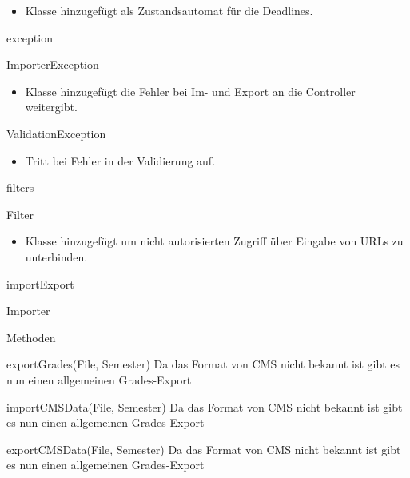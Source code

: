\documentclass[parskip=full]{scrartcl}
\newcommand{\changeDescription}[1]{{\newline\color{black}\normalfont #1}}
\newcommand{\code}[1]{{\ttfamily #1}}
\begin{document}
\begin{itemPackage}
\begin{itemClass}
	\begin{itemize}
	  \item Klasse hinzugefügt als Zustandsautomat für die Deadlines. 
	\end{itemize}
	\end{itemClass}
\item exception
\begin{itemClass}
\item ImporterException 
\begin{itemize}
	  \item Klasse hinzugefügt die Fehler bei Im- und Export an die Controller
	  weitergibt.
	\end{itemize}
	\item ValidationException
\begin{itemize}
  \item Tritt bei Fehler in der Validierung auf.
\end{itemize}
\end{itemClass}
\item filters
\begin{itemClass}
\item Filter
\begin{itemize}
	  \item Klasse hinzugefügt um nicht autorisierten Zugriff über Eingabe von URLs
	  zu unterbinden.
	\end{itemize}
\end{itemClass}
\item importExport
\begin{itemClass}
\item Importer
\begin{itemClassSub}
\item Methoden
\begin{itemPlus}
\item exportGrades(File, Semester) \changeDescription{Da das Format von CMS
nicht bekannt ist gibt es nun einen allgemeinen \code{Grades}-Export}
\end{itemPlus}
\begin{itemMinus}
\item importCMSData(File, Semester) \changeDescription{Da das Format von CMS
nicht bekannt ist gibt es nun einen allgemeinen \code{Grades}-Export}
\item exportCMSData(File, Semester) \changeDescription{Da das Format von CMS
nicht bekannt ist gibt es nun einen allgemeinen \code{Grades}-Export}
\end{itemMinus}
\end{itemClassSub}

\end{itemClass}
\end{itemPackage}
\end{document}
